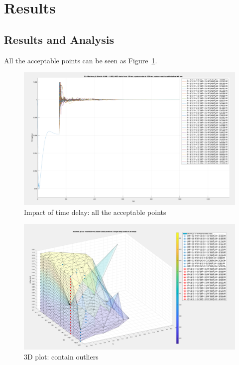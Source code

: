 \section{Results} %
\subsection{Results and Analysis} %
\label{subsection5.4.1}

All the acceptable points can be seen as Figure~\ref{5_4_1_i}.\\

\begin{figure}[htbp]
\centering
\includegraphics[width = .819\textwidth]{figure/5_4_1_i.png}
\caption{Impact of time delay: all the acceptable points}
\label{5_4_1_i}
\end{figure}



\begin{figure}[htbp]
\centering
\includegraphics[width = .819\textwidth]{figure/5_4_1_Outlier.png}
\caption{3D plot: contain outliers}
\label{5_4_1_Outlier}
\end{figure}



